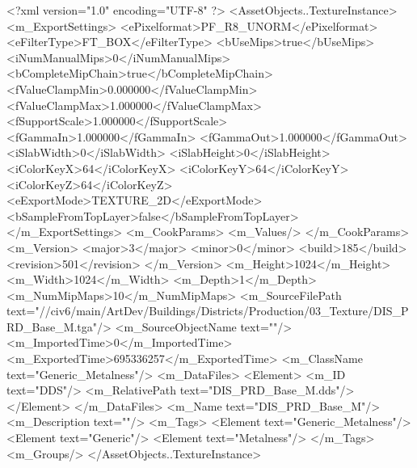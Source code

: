 <?xml version="1.0" encoding="UTF-8" ?>
<AssetObjects..TextureInstance>
	<m_ExportSettings>
		<ePixelformat>PF_R8_UNORM</ePixelformat>
		<eFilterType>FT_BOX</eFilterType>
		<bUseMips>true</bUseMips>
		<iNumManualMips>0</iNumManualMips>
		<bCompleteMipChain>true</bCompleteMipChain>
		<fValueClampMin>0.000000</fValueClampMin>
		<fValueClampMax>1.000000</fValueClampMax>
		<fSupportScale>1.000000</fSupportScale>
		<fGammaIn>1.000000</fGammaIn>
		<fGammaOut>1.000000</fGammaOut>
		<iSlabWidth>0</iSlabWidth>
		<iSlabHeight>0</iSlabHeight>
		<iColorKeyX>64</iColorKeyX>
		<iColorKeyY>64</iColorKeyY>
		<iColorKeyZ>64</iColorKeyZ>
		<eExportMode>TEXTURE_2D</eExportMode>
		<bSampleFromTopLayer>false</bSampleFromTopLayer>
	</m_ExportSettings>
	<m_CookParams>
		<m_Values/>
	</m_CookParams>
	<m_Version>
		<major>3</major>
		<minor>0</minor>
		<build>185</build>
		<revision>501</revision>
	</m_Version>
	<m_Height>1024</m_Height>
	<m_Width>1024</m_Width>
	<m_Depth>1</m_Depth>
	<m_NumMipMaps>10</m_NumMipMaps>
	<m_SourceFilePath text="//civ6/main/ArtDev/Buildings/Districts/Production/03_Texture/DIS_PRD_Base_M.tga"/>
	<m_SourceObjectName text=""/>
	<m_ImportedTime>0</m_ImportedTime>
	<m_ExportedTime>695336257</m_ExportedTime>
	<m_ClassName text="Generic_Metalness"/>
	<m_DataFiles>
		<Element>
			<m_ID text="DDS"/>
			<m_RelativePath text="DIS_PRD_Base_M.dds"/>
		</Element>
	</m_DataFiles>
	<m_Name text="DIS_PRD_Base_M"/>
	<m_Description text=""/>
	<m_Tags>
		<Element text="Generic_Metalness"/>
		<Element text="Generic"/>
		<Element text="Metalness"/>
	</m_Tags>
	<m_Groups/>
</AssetObjects..TextureInstance>

